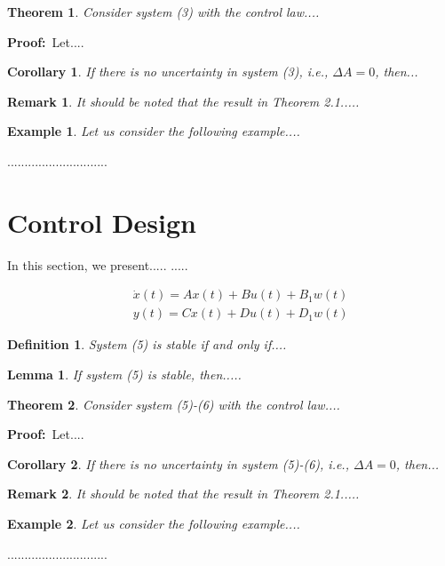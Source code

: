 \documentclass[12pt,a4paper]{jihmsp}
\newtheorem{corollary}{Corollary}[section]
\newtheorem{theorem}{Theorem}[section]
\newtheorem{lemma}{Lemma}[section]
\newtheorem{remark}{Remark}[section]
\newtheorem{definition}{Definition}[section]
\newtheorem{example}{Example}[section]
\begin{document}
	\begin{theorem}
		Consider system (3) with the control law....
	\end{theorem}
	
	{\bf Proof:}\ Let....
	
	\begin{corollary}
		If there is no uncertainty in system (3), i.e., $\Delta A=0$, then...
	\end{corollary}
	
	\begin{remark}
		It should be noted that the result in Theorem 2.1.....
	\end{remark}
	
	\begin{example}
		Let us consider the following example....
	\end{example}
	.............................
	
	\section {Control Design}
	In this section, we present.....
	.....
	
	\begin{eqnarray}
	&&\dot x(t)=Ax(t)+Bu(t)+B_1w(t)\\
	&&y(t)=Cx(t)+Du(t)+D_1w(t)
	\end{eqnarray}
	
	\begin{definition}
		System (5) is stable if and only if....
	\end{definition}
	
	\begin{lemma}
		If system (5) is stable, then.....
	\end{lemma}
	
	\begin{theorem}
		Consider system (5)-(6) with the control law....
	\end{theorem}
	
	{\bf Proof:}\ Let....
	
	\begin{corollary}
		If there is no uncertainty in system (5)-(6), i.e., $\Delta A=0$, then...
	\end{corollary}
	
	\begin{remark}
		It should be noted that the result in Theorem 2.1.....
	\end{remark}
	
	\begin{example}
		Let us consider the following example....
	\end{example}
	.............................
	
\end{document}
